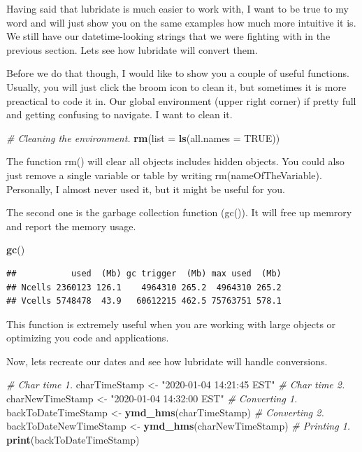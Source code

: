\documentclass[]{book}
\newenvironment{Shaded}{\begin{snugshade}}{\end{snugshade}}
\newcommand{\CommentTok}[1]{\textcolor[rgb]{0.56,0.35,0.01}{\textit{#1}}}
\newcommand{\DataTypeTok}[1]{\textcolor[rgb]{0.13,0.29,0.53}{#1}}
\newcommand{\KeywordTok}[1]{\textcolor[rgb]{0.13,0.29,0.53}{\textbf{#1}}}
\newcommand{\NormalTok}[1]{#1}
\newcommand{\OtherTok}[1]{\textcolor[rgb]{0.56,0.35,0.01}{#1}}
\newcommand{\StringTok}[1]{\textcolor[rgb]{0.31,0.60,0.02}{#1}}
\begin{document}
Having said that lubridate is much easier to work with, I want to be true to my word and will just show you on the same examples how much more intuitive it is. We still have our datetime-looking strings that we were fighting with in the previous section. Lets see how lubridate will convert them.

Before we do that though, I would like to show you a couple of useful functions. Usually, you will just click the broom icon to clean it, but sometimes it is more preactical to code it in. Our global environment (upper right corner) if pretty full and getting confusing to navigate. I want to clean it.

\begin{Shaded}
\begin{Highlighting}[]
\CommentTok{# Cleaning the environment.}
\KeywordTok{rm}\NormalTok{(}\DataTypeTok{list =} \KeywordTok{ls}\NormalTok{(}\DataTypeTok{all.names =} \OtherTok{TRUE}\NormalTok{)) }
\end{Highlighting}
\end{Shaded}

The function rm() will clear all objects includes hidden objects. You could also just remove a single variable or table by writing rm(nameOfTheVariable). Personally, I almost never used it, but it might be useful for you.

The second one is the garbage collection function (gc()). It will free up memrory and report the memory usage.

\begin{Shaded}
\begin{Highlighting}[]
\KeywordTok{gc}\NormalTok{() }
\end{Highlighting}
\end{Shaded}

\begin{verbatim}
##           used  (Mb) gc trigger  (Mb) max used  (Mb)
## Ncells 2360123 126.1    4964310 265.2  4964310 265.2
## Vcells 5748478  43.9   60612215 462.5 75763751 578.1
\end{verbatim}

This function is extremely useful when you are working with large objects or optimizing you code and applications.

Now, lets recreate our dates and see how lubridate will handle conversions.

\begin{Shaded}
\begin{Highlighting}[]
\CommentTok{# Char time 1.}
\NormalTok{charTimeStamp <-}\StringTok{ "2020-01-04 14:21:45 EST"}
\CommentTok{# Char time 2.}
\NormalTok{charNewTimeStamp <-}\StringTok{ "2020-01-04 14:32:00 EST"}
\CommentTok{# Converting 1.}
\NormalTok{backToDateTimeStamp <-}\StringTok{ }\KeywordTok{ymd_hms}\NormalTok{(charTimeStamp)}
\CommentTok{# Converting 2.}
\NormalTok{backToDateNewTimeStamp <-}\StringTok{ }\KeywordTok{ymd_hms}\NormalTok{(charNewTimeStamp)}
\CommentTok{# Printing 1.}
\KeywordTok{print}\NormalTok{(backToDateTimeStamp)}
\end{Highlighting}
\end{Shaded}
\end{document}
